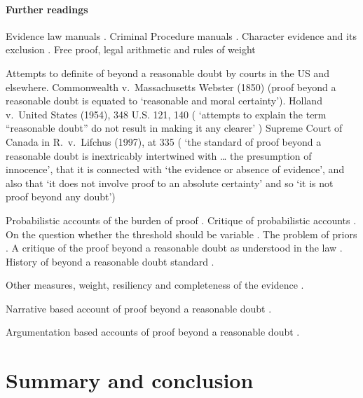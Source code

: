 \documentclass[10pt]{article}
\begin{document}
\paragraph{Further readings}
Evidence law manuals  \citep{fisher2008,  mendez2008}. 
Criminal Procedure manuals \citep{allenEtAl2011}.
Character evidence and its exclusion \citep{redmayne2015}.
Free proof, legal arithmetic and rules of weight
 

Attempts to definite of beyond a reasonable doubt 
by courts in the US and elsewhere. Commonwealth v.\ Massachusetts Webster (1850) (proof beyond a reasonable doubt is equated to 
`reasonable and moral certainty'). Holland v.\ United States (1954), 348 U.S. 121, 140 
( `attempts to explain the term ``reasonable doubt'' do not result in making it any clearer' ) 
Supreme Court of Canada in R.\ v.\ Lifchus (1997), at 335 ( `the standard of proof beyond a reasonable 
doubt is inextricably intertwined with \dots 
the presumption of innocence', that it is connected with `the evidence or  
absence of evidence', and also that `it does not involve proof to an absolute certainty' and so 
`it is not proof beyond any doubt')


Probabilistic accounts of the burden of proof
\citep{kaplan1968, kaye1986, kaye1999, hamer2004, cheng2013}.
Critique of probabilistic accounts \citep{cohen1977, nesson79, thomson86, stein05, ho08, pardoAllen2008, haack2011}.
On the question whether the threshold should be variable \citep{kaplow2012, picinali2013}.
The problem of priors \citep{finkelsteinFairley1970, friedman2000}.
A critique of the proof beyond a reasonable doubt  
as understood in the law \citep{laudan2006}.
History of beyond a reasonable doubt standard 
\citep{shapiro1991, whitman2008}.

Other measures, weight, resiliency and completeness 
of the evidence \citep{kaye1999, stein05}.



Narrative based account of proof beyond a reasonable doubt \citep{allen2010, allenStein2013}.

Argumentation based accounts of proof beyond a reasonable doubt \citep{}.















\section{Summary and conclusion}

%
	
%

\end{document}
